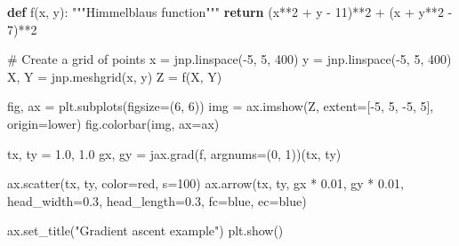 \documentclass[
  letterpaper,
  DIV=11,
  numbers=noendperiod]{scrreprt}
\newenvironment{Shaded}{\begin{snugshade}}{\end{snugshade}}
\newcommand{\CommentTok}[1]{\textcolor[rgb]{0.37,0.37,0.37}{#1}}
\newcommand{\ControlFlowTok}[1]{\textcolor[rgb]{0.00,0.23,0.31}{\textbf{#1}}}
\newcommand{\DecValTok}[1]{\textcolor[rgb]{0.68,0.00,0.00}{#1}}
\newcommand{\FloatTok}[1]{\textcolor[rgb]{0.68,0.00,0.00}{#1}}
\newcommand{\KeywordTok}[1]{\textcolor[rgb]{0.00,0.23,0.31}{\textbf{#1}}}
\newcommand{\NormalTok}[1]{\textcolor[rgb]{0.00,0.23,0.31}{#1}}
\newcommand{\OperatorTok}[1]{\textcolor[rgb]{0.37,0.37,0.37}{#1}}
\newcommand{\StringTok}[1]{\textcolor[rgb]{0.13,0.47,0.30}{#1}}
\theoremstyle{plain}
\theoremstyle{plain}
\theoremstyle{definition}
\theoremstyle{definition}
\theoremstyle{remark}
\begin{document}
\begin{Shaded}
\begin{Highlighting}[]
\KeywordTok{def}\NormalTok{ f(x, y):}
    \CommentTok{"""Himmelblau\textquotesingle{}s function"""}
    \ControlFlowTok{return}\NormalTok{ (x}\OperatorTok{**}\DecValTok{2} \OperatorTok{+}\NormalTok{ y }\OperatorTok{{-}} \DecValTok{11}\NormalTok{)}\OperatorTok{**}\DecValTok{2} \OperatorTok{+}\NormalTok{ (x }\OperatorTok{+}\NormalTok{ y}\OperatorTok{**}\DecValTok{2} \OperatorTok{{-}} \DecValTok{7}\NormalTok{)}\OperatorTok{**}\DecValTok{2}

\CommentTok{\# Create a grid of points}
\NormalTok{x }\OperatorTok{=}\NormalTok{ jnp.linspace(}\OperatorTok{{-}}\DecValTok{5}\NormalTok{, }\DecValTok{5}\NormalTok{, }\DecValTok{400}\NormalTok{)}
\NormalTok{y }\OperatorTok{=}\NormalTok{ jnp.linspace(}\OperatorTok{{-}}\DecValTok{5}\NormalTok{, }\DecValTok{5}\NormalTok{, }\DecValTok{400}\NormalTok{)}
\NormalTok{X, Y }\OperatorTok{=}\NormalTok{ jnp.meshgrid(x, y)}
\NormalTok{Z }\OperatorTok{=}\NormalTok{ f(X, Y)}

\NormalTok{fig, ax }\OperatorTok{=}\NormalTok{ plt.subplots(figsize}\OperatorTok{=}\NormalTok{(}\DecValTok{6}\NormalTok{, }\DecValTok{6}\NormalTok{))}
\NormalTok{img }\OperatorTok{=}\NormalTok{ ax.imshow(Z, extent}\OperatorTok{=}\NormalTok{[}\OperatorTok{{-}}\DecValTok{5}\NormalTok{, }\DecValTok{5}\NormalTok{, }\OperatorTok{{-}}\DecValTok{5}\NormalTok{, }\DecValTok{5}\NormalTok{], origin}\OperatorTok{=}\StringTok{\textquotesingle{}lower\textquotesingle{}}\NormalTok{)}
\NormalTok{fig.colorbar(img, ax}\OperatorTok{=}\NormalTok{ax)}

\NormalTok{tx, ty }\OperatorTok{=} \FloatTok{1.0}\NormalTok{, }\FloatTok{1.0}
\NormalTok{gx, gy }\OperatorTok{=}\NormalTok{ jax.grad(f, argnums}\OperatorTok{=}\NormalTok{(}\DecValTok{0}\NormalTok{, }\DecValTok{1}\NormalTok{))(tx, ty)}

\NormalTok{ax.scatter(tx, ty, color}\OperatorTok{=}\StringTok{\textquotesingle{}red\textquotesingle{}}\NormalTok{, s}\OperatorTok{=}\DecValTok{100}\NormalTok{)}
\NormalTok{ax.arrow(tx, ty, gx }\OperatorTok{*} \FloatTok{0.01}\NormalTok{, gy }\OperatorTok{*} \FloatTok{0.01}\NormalTok{, head\_width}\OperatorTok{=}\FloatTok{0.3}\NormalTok{, head\_length}\OperatorTok{=}\FloatTok{0.3}\NormalTok{, fc}\OperatorTok{=}\StringTok{\textquotesingle{}blue\textquotesingle{}}\NormalTok{, ec}\OperatorTok{=}\StringTok{\textquotesingle{}blue\textquotesingle{}}\NormalTok{)}

\NormalTok{ax.set\_title(}\StringTok{"Gradient ascent example"}\NormalTok{)}
\NormalTok{plt.show()}
\end{Highlighting}
\end{Shaded}
\end{document}
